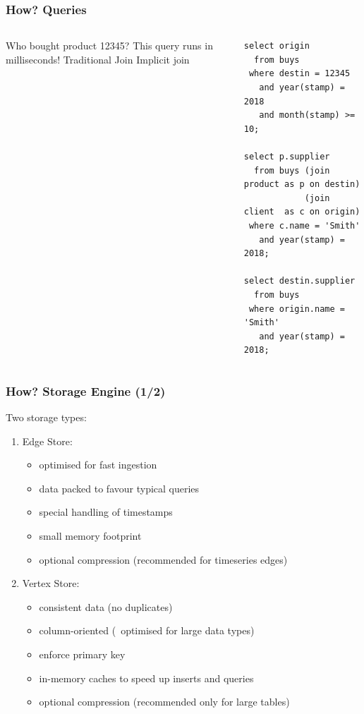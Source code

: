\documentclass{beamer}
\begin{document}
\begin{frame}[fragile]
\frametitle{How? Queries}
\begin{columns}[T]
\vskip0.5cm
{\small Who bought product 12345?}
{\small This query runs in milliseconds!}
\vskip0.7cm
{\small Traditional Join}
\vskip1.9cm
{\small Implicit join}
\begin{sqlcode}
\begin{lstlisting}
select origin
  from buys
 where destin = 12345
   and year(stamp) = 2018
   and month(stamp) >= 10;

select p.supplier
  from buys (join product as p on destin)
            (join client  as c on origin)
 where c.name = 'Smith'
   and year(stamp) = 2018;

select destin.supplier
  from buys
 where origin.name = 'Smith'
   and year(stamp) = 2018;
\end{lstlisting}
\end{sqlcode}
\end{columns}
\end{frame}

\begin{frame}
\frametitle{How? Storage Engine (1/2)}
Two storage types:
\begin{enumerate}
\item Edge Store:
      \begin{itemize}
      \item optimised for fast ingestion
      \item data packed to favour typical queries
      \item special handling of timestamps
      \item small memory footprint
      \item optional compression
            (recommended for timeseries edges)
      \end{itemize}
\item Vertex Store:
      \begin{itemize}
      \item consistent data (no duplicates)
      \item column-oriented
            (\ie\ optimised for large data types)
      \item enforce primary key
      \item in-memory caches to speed up
            inserts and queries
      \item optional compression
            (recommended only for large tables)
      \end{itemize}
\end{enumerate}
\end{frame}
\end{document}
